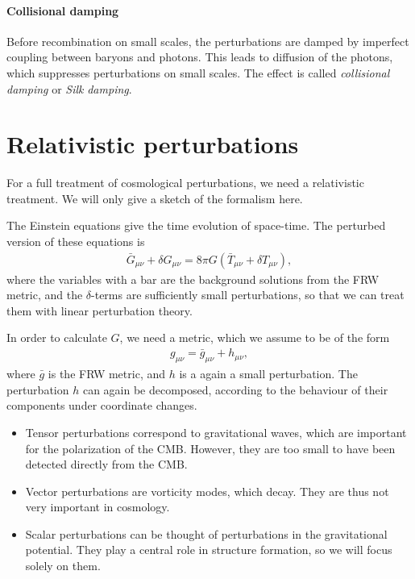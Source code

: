 \paragraph*{Collisional damping}
Before recombination on small scales, the perturbations are damped by imperfect coupling between baryons and photons. This leads to diffusion of the photons, which suppresses perturbations on small scales. The effect is called \emph{collisional damping} or \emph{Silk} \emph{damping}.



\section{Relativistic perturbations}
For a full treatment of cosmological perturbations, we need a relativistic treatment. We will only give a sketch of the formalism here.

The Einstein equations give the time evolution of space-time. The perturbed version of these equations is
\begin{align*}
	\bar{G}_{\mu\nu} + \delta G_{\mu\nu} = 8 \pi G (\bar{T}_{\mu\nu} + \delta T_{\mu\nu}),
\end{align*}
where the variables with a bar are the background solutions from the FRW metric, and the $\delta$-terms are sufficiently small perturbations, so that we can treat them with linear perturbation theory.

In order to calculate $G$, we need a metric, which we assume to be of the form
\begin{align*}
	g_{\mu \nu} = \bar{g}_{\mu\nu} + h_{\mu\nu},
\end{align*}
where $\bar{g}$ is the FRW metric, and $h$ is a again a small perturbation.
The perturbation $h$ can again be decomposed, according to the behaviour of their components under coordinate changes.
\begin{itemize}
	\item Tensor perturbations correspond to gravitational waves, which are important for the polarization of the CMB. However, they are too small to have been detected directly from the CMB.
	\item Vector perturbations are vorticity modes, which decay. They are thus not very important in cosmology.
	\item Scalar perturbations can be thought of perturbations in the gravitational potential. They play a central role in structure formation, so we will focus solely on them.
\end{itemize}


